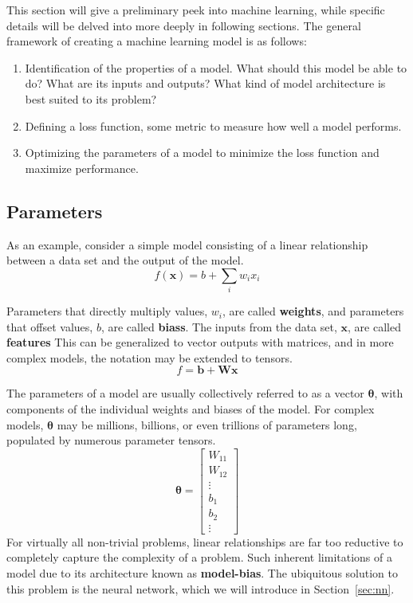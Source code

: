 \documentclass[12pt]{report}
\theoremstyle{definition}
\theoremstyle{remark}
\begin{document}
This section will give a preliminary peek into machine learning, while specific details will be delved into more deeply in following sections. The general framework of creating a machine learning model is as follows:

\begin{enumerate}
    \item Identification of the properties of a model. What should this model be able to do? What are its inputs and outputs? What kind of model architecture is best suited to its problem?
    \item Defining a loss function, some metric to measure how well a model performs.
    \item Optimizing the parameters of a model to minimize the loss function and maximize performance.
\end{enumerate}

\subsection{Parameters}

As an example, consider a simple model consisting of a linear relationship between a data set and the output of the model.
\begin{equation}
    f(\mathbf{x}) = b +\sum_i w_i x_i
\end{equation}

Parameters that directly multiply values, $w_i$, are called \textbf{\glspl{weight}}, and parameters that offset values, $b$, are called \textbf{\glspl{bias}}. The inputs from the data set, $\mathbf{x}$, are called \textbf{\glspl{feature}} This can be generalized to vector outputs with matrices, and in more complex models, the notation may be extended to tensors.
\begin{equation}
    f = \mathbf{b} + \mathbf{W}\mathbf{x}
\end{equation}

The parameters of a model are usually collectively referred to as a vector $\boldsymbol{\theta}$, with components of the individual weights and biases of the model. For complex models, $\boldsymbol{\theta}$ may be millions, billions, or even trillions of parameters long, populated by numerous parameter tensors.
\begin{equation}
    \boldsymbol{\theta} = \begin{bmatrix}
        W_{11} \\
        W_{12} \\
        \vdots \\
        b_1 \\
        b_2 \\
        \vdots
    \end{bmatrix}
\end{equation}
For virtually all non-trivial problems, linear relationships are far too reductive to completely capture the complexity of a problem. Such inherent limitations of a model due to its architecture known as \textbf{\gls{model-bias}}. The ubiquitous solution to this problem is the neural network, which we will introduce in Section~\ref{sec:nn}.
\end{document}
